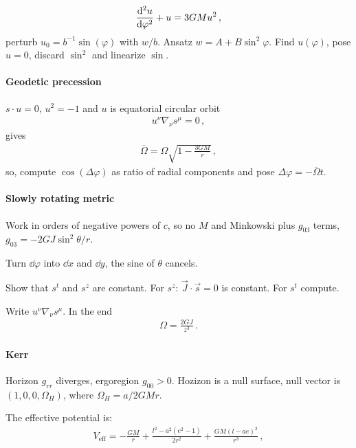 \documentclass[main.tex]{subfiles}
\begin{document}
%
\begin{align}
\dv[2]{u}{\varphi } + u = 3GM u^2
\,,
\end{align}
%
perturb \(u_0 = b^{-1} \sin(\varphi )\) with \(w/b\). 
Ansatz \(w = A + B \sin^2\varphi \). Find \(u(\varphi )\), 
pose \(u=0\), discard \(\sin^2\) and linearize \(\sin\). 

\paragraph{Geodetic precession}

\(s \cdot u =0\), \(u^2 = -1 \) and \(u\) is equatorial circular orbit
%
\begin{align}
u^{\nu } \nabla_{\nu } s^{\mu } = 0
\,,
\end{align}
%
gives 
%
\begin{align}
\overline{\Omega} = \Omega \sqrt{1 - \frac{3GM}{r}}
\,,
\end{align}
%
so, compute \(\cos(\Delta \varphi )\) as ratio of radial components and pose \(\Delta \varphi = - \overline{\Omega} t \). 

\paragraph{Slowly rotating metric}

Work in orders of negative powers of \(c\), so no \(M\) and Minkowski plus \(g_{03} \) terms, \(g_{03} = -2 GJ \sin^2\theta /r\).

Turn \(\dd{\varphi }\) into \(\dd{x}\) and \(\dd{y}\), the sine of \(\theta \) cancels.

Show that \(s^{t}\) and \(s^{z }\) are constant. For \(s^{z}\): \(\vec{J} \cdot \vec{s} = 0\) is constant. For \(s^{t}\) compute.

Write \(u^{\nu } \nabla_{\nu } s^{\mu }\). 
In the end 
%
\begin{align}
\Omega = \frac{2GJ}{z^3}
\,.
\end{align}

\paragraph{Kerr} 

Horizon \(g_{rr}\) diverges, ergoregion \(g_{00} >0\). 
Hozizon is a null surface, null vector is \((1, 0,0,\Omega_{H})\), where \(\Omega_{H} = a / 2GMr\). 

The effective potential is:
\begin{align}
V _{\text{eff}} = - \frac{GM}{r} + \frac{l^2- a^2 (e^2-1)}{2 r^2} 
+ \frac{GM (l - ae)^2}{r^3}
\,,
\end{align}
%
\end{document}
